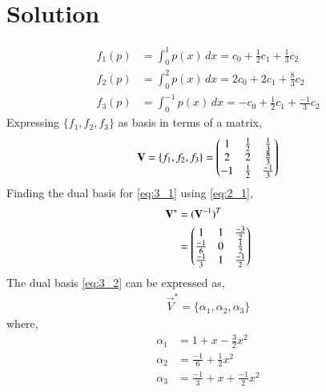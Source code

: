 \documentclass[journal,12pt,twocolumn]{IEEEtran}
\begin{document}
\section{Solution}
\begin{align}
    f_1(p) &= \int_{0}^{1} p(x) \, dx = c_0 + \frac{1}{2}c_1 + \frac{1}{3}c_2 \nonumber \\
    f_2(p) &= \int_{0}^{2} p(x) \, dx = 2c_0 + 2c_1 + \frac{8}{3}c_2 \nonumber \\
    f_3(p) &= \int_{0}^{-1} p(x) \, dx = -c_0 + \frac{1}{2}c_1 + \frac{-1}{3}c_2 \nonumber
\end{align}
Expressing $\{f_1, f_2, f_3\}$ as basis in terms of a matrix,
\begin{align}
    \mathbf{V} = \{f_1, f_2, f_3\} = 
    \begin{pmatrix}1 & \frac{1}{2} & \frac{1}{3} \\ 2 & 2 & \frac{8}{3} \\ -1 & \frac{1}{2} & \frac{-1}{3}\end{pmatrix} \label{eq:3_1}
\end{align}
Finding the dual basis for \eqref{eq:3_1} using \eqref{eq:2_1}, 
\begin{align}
    \mathbf{V}^* &= (\mathbf{V}^{-1})^T \nonumber \\
    &= \begin{pmatrix}1 & 1 & \frac{-3}{2} \\ \frac{-1}{6} & 0 & \frac{1}{2} \\ \frac{-1}{3} & 1 & \frac{-1}{2}\end{pmatrix} \label{eq:3_2}
\end{align}
The dual basis \eqref{eq:3_2} can be expressed as,
\begin{align}
    \vec{V}^* = \{\alpha_1, \alpha_2, \alpha_3\} \nonumber 
\end{align}
where,
\begin{align}
    \alpha_1 &= 1 + x - \frac{3}{2}x^2 \label{3_3} \\
    \alpha_2 &= \frac{-1}{6} + \frac{1}{2}x^2 \label{3_4} \\
    \alpha_3 &= \frac{-1}{3} + x + \frac{-1}{2}x^2 \label{3_5} 
\end{align}
\end{document}
